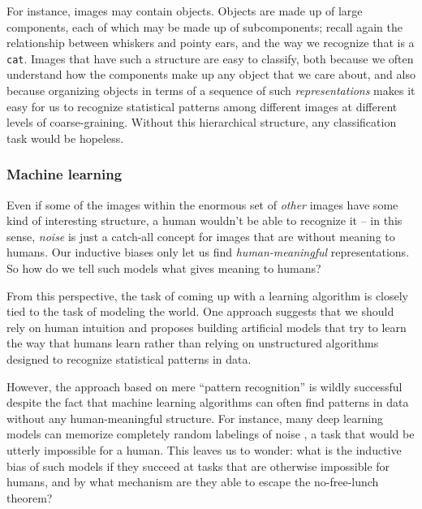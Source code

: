 \documentclass[12pt]{article}
\begin{document}
For instance, images may contain objects. Objects are made up of large components, each of which may be made up of subcomponents; recall again the relationship between whiskers and pointy ears, and the way we recognize that \Cat is a \texttt{cat}.
Images that have such a structure 
are easy to classify, both because we often understand how the components make up any object that we care about, and also because organizing objects in terms of a sequence of such \emph{representations} makes it easy for us to recognize statistical patterns among  different images at different levels of coarse-graining. 
Without this hierarchical structure, any classification task would be hopeless.


\subsubsection*{Machine learning}

Even if some of the images within the enormous set of \emph{other} images have some kind of interesting structure, a human wouldn't be able to recognize it -- in this sense, \emph{noise} is just a catch-all concept for images that are without meaning to humans. Our inductive biases only let us find \emph{human-meaningful} representations.   So how do we tell such models what gives meaning to humans?



From this perspective, the task of coming up with a learning algorithm is closely tied to the task of modeling the world. One approach suggests that we should rely on human intuition and proposes building artificial models that try to learn the way that humans learn \cite{tenenbaum2011grow,lake2017building}
rather than relying on unstructured algorithms designed to recognize statistical patterns in data. 

However, the approach based on mere ``pattern recognition'' is wildly successful \cite{ImageNet2012,goodfellow2014generative,mikolov2013efficient,mikolov2013distributed,BERT2018,radford2019language,Brown2020LanguageMA,mnih2015human,silver2016mastering,silver2018general,berner2019dota,starcraft,muzero,alphafold2prelim} despite the fact that machine learning algorithms can often find patterns in data without any human-meaningful structure. For instance, many deep learning models can memorize completely random labelings of noise \cite{zhang2016understanding}, a task that would be utterly impossible for a human.
This leaves us to wonder: what is the inductive bias of such models if they succeed at tasks that are otherwise impossible for humans, and by what mechanism are they able to %
escape the no-free-lunch theorem? 
\end{document}
